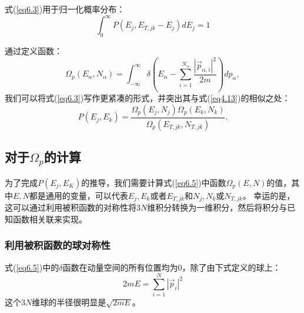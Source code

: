 \documentclass[UTF8]{ctexart}
\numberwithin{equation}{section}%
\numberwithin{figure}{section}%
\begin{document}
    式(\ref{eq6.3})用于归一化概率分布：
    \begin{equation}
        \int_{0}^{\infty} P\left(E_{j}, E_{T, j k}-E_{j}\right) d E_{j}=1
    \end{equation}

    通过定义函数：
    \begin{equation}\label{eq6.5}
        \Omega_{p}\left(E_{\alpha}, N_{\alpha}\right)=\int_{-\infty}^{\infty} \delta\left(E_{\alpha}-\sum_{i=1}^{N_{\alpha}} \frac{\left|\vec{p}_{\alpha, i}\right|^{2}}{2 m}\right) d p_{\alpha},
    \end{equation}
    我们可以将式(\ref{eq6.3})写作更紧凑的形式，并突出其与式(\ref{eq4.13})的相似之处：
    \begin{equation}\label{eq6.6}
        P\left(E_{j}, E_{k}\right)=\frac{\Omega_{p}\left(E_{j}, N_{j}\right) \Omega_{p}\left(E_{k}, N_{k}\right)}{\Omega_{p}\left(E_{T, j k}, N_{T, j k}\right)} .
    \end{equation}

    \subsection{\texorpdfstring{对于$\Omega_p$的计算}{对于Ωp的计算}}\label{sec6.2}
    为了完成$P(E_j,E_K)$的推导，我们需要计算式(\ref{eq6.5})中函数$\Omega_p(E,N)$的值，其中$E,N$都是通用的变量，可以代表$E_j,E_k$或者$E_{T,jk}$和$N_j,N_k$或$N_{T,jk}$。
    幸运的是，这可以通过利用被积函数的对称性将$3N$维积分转换为一维积分，然后将积分与已知函数相关联来实现。

    \subsubsection{利用被积函数的球对称性}
    式(\ref{eq6.5})中的$\delta$函数在动量空间的所有位置均为0，除了由下式定义的球上：
    \begin{equation}
        2 m E=\sum_{i=1}^{N}\left|\vec{p}_{i}\right|^{2}
    \end{equation}
    这个$3N$维球的半径很明显是$\sqrt{2mE}$。
\end{document}
